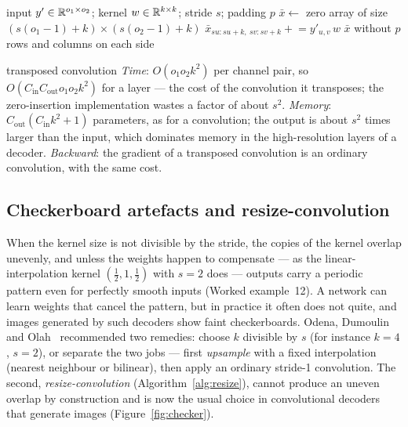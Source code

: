 \documentclass[11pt]{article}
\newcommand{\Cin}{C_{\mathrm{in}}}
\newcommand{\Cout}{C_{\mathrm{out}}}
\begin{document}
\begin{algorithm}[htbp]
\caption{Transposed convolution (one input and one output channel)}\label{alg:tconv}
\begin{algorithmic}[1]
\Require input $y' \in \mathbb{R}^{o_1 \times o_2}$; kernel $w \in \mathbb{R}^{k \times k}$; stride $s$; padding $p$
  \State $\bar x \gets$ zero array of size $(s(o_1 - 1) + k) \times (s(o_2 - 1) + k)$
    \State $\bar x_{su:su+k,\ sv:sv+k} \mathrel{+}= y'_{u,v}\, w$ 
  \EndFor
  \State \Return $\bar x$ without $p$ rows and columns on each side 
\EndFunction
\end{algorithmic}
\end{algorithm}

\begin{runtime}{transposed convolution}
\emph{Time}: $O(o_1o_2k^2)$ per channel pair, so $O(\Cin\Cout o_1o_2k^2)$ for a layer --- the cost of the convolution it
transposes; the zero-insertion implementation wastes a factor of about $s^2$. \emph{Memory}: $\Cout(\Cin k^2 + 1)$
parameters, as for a convolution; the output is about $s^2$ times larger than the input, which dominates memory in the
high-resolution layers of a decoder. \emph{Backward}: the gradient of a transposed convolution is an ordinary
convolution, with the same cost.
\end{runtime}

\subsection{Checkerboard artefacts and resize-convolution}

When the kernel size is not divisible by the stride, the copies of the kernel overlap unevenly, and unless the weights
happen to compensate --- as the linear-interpolation kernel $(\tfrac12, 1, \tfrac12)$ with $s = 2$ does --- outputs carry
a periodic pattern even for perfectly smooth inputs (Worked example~12). A network can learn weights that cancel the pattern,
but in practice it often does not quite, and images generated by such decoders show faint checkerboards. Odena, Dumoulin
and Olah~\cite{odena2016} recommended two remedies: choose $k$ divisible by $s$ (for instance $k = 4$, $s = 2$), or
separate the two jobs --- first \emph{upsample} with a fixed interpolation (nearest neighbour or bilinear), then apply an
ordinary stride-1 convolution. The second, \emph{resize-convolution} (Algorithm~\ref{alg:resize}), cannot produce an
uneven overlap by construction and is now the usual choice in convolutional decoders that generate images
(Figure~\ref{fig:checker}).
\end{document}
